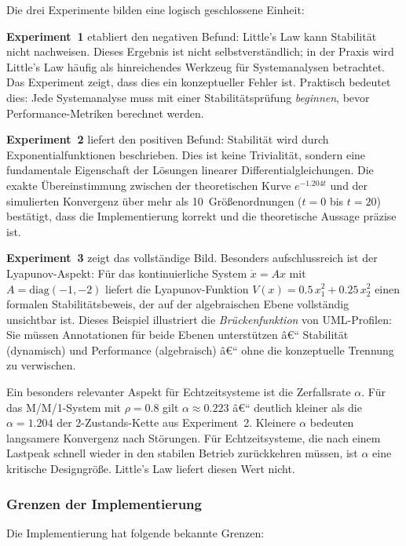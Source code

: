 ﻿\documentclass[a4paper,12pt]{scrreprt}
\theoremstyle{definition}
\begin{document}
Die drei Experimente bilden eine logisch geschlossene Einheit:

\textbf{Experiment~1} etabliert den negativen Befund: Little's Law
kann Stabilität nicht nachweisen.  Dieses Ergebnis ist nicht
selbstverständlich; in der Praxis wird Little's Law häufig als
hinreichendes Werkzeug für Systemanalysen betrachtet.  Das Experiment
zeigt, dass dies ein konzeptueller Fehler ist.  Praktisch bedeutet
dies: Jede Systemanalyse muss mit einer Stabilitätsprüfung
\emph{beginnen}, bevor Performance-Metriken berechnet werden.

\textbf{Experiment~2} liefert den positiven Befund: Stabilität wird
durch Exponentialfunktionen beschrieben.  Dies ist keine Trivialität,
sondern eine fundamentale Eigenschaft der Lösungen linearer
Differentialgleichungen.  Die exakte Übereinstimmung zwischen der
theoretischen Kurve $e^{-1.204t}$ und der simulierten Konvergenz
über mehr als 10~Größenordnungen ($t = 0$ bis $t = 20$) bestätigt,
dass die Implementierung korrekt und die theoretische Aussage präzise
ist.

\textbf{Experiment~3} zeigt das vollständige Bild.  Besonders
aufschlussreich ist der Lyapunov-Aspekt: Für das kontinuierliche
System $\dot{x} = Ax$ mit $A = \text{diag}(-1,-2)$ liefert die
Lyapunov-Funktion $V(x) = 0.5\,x_1^2 + 0.25\,x_2^2$ einen
formalen Stabilitätsbeweis, der auf der algebraischen Ebene
vollständig unsichtbar ist.  Dieses Beispiel illustriert die
\emph{Brückenfunktion} von UML-Profilen: Sie müssen Annotationen
für beide Ebenen unterstützen â€“ Stabilität (dynamisch) und
Performance (algebraisch) â€“ ohne die konzeptuelle Trennung zu
verwischen.

Ein besonders relevanter Aspekt für Echtzeitsysteme ist die
Zerfallsrate $\alpha$.  Für das M/M/1-System mit $\rho = 0.8$ gilt
$\alpha \approx 0.223$ â€“ deutlich kleiner als die $\alpha = 1.204$
der 2-Zustands-Kette aus Experiment~2.  Kleinere $\alpha$ bedeuten
langsamere Konvergenz nach Störungen.  Für Echtzeitsysteme, die
nach einem Lastpeak schnell wieder in den stabilen Betrieb zurückkehren
müssen, ist $\alpha$ eine kritische Designgröße.  Little's Law
liefert diesen Wert nicht.

\subsubsection{Grenzen der Implementierung}
\label{subsubsec:grenzen}

Die Implementierung hat folgende bekannte Grenzen:
\end{document}
